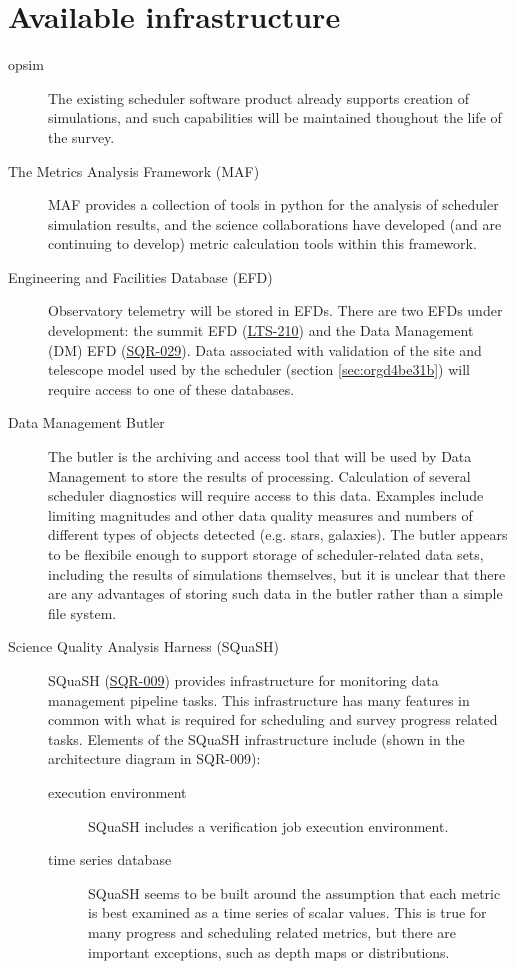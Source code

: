 \section{Available infrastructure}
\label{sec:org85291d5}
\begin{description}
\item[{opsim}] The existing scheduler software product already supports creation of simulations, and such capabilities will be maintained thoughout the life of the survey.
\item[{The Metrics Analysis Framework (MAF)}] MAF provides a collection of tools in python for the analysis of scheduler simulation results, and the science collaborations have developed (and are continuing to develop) metric calculation tools within this framework.
\item[{Engineering and Facilities Database (EFD)}] Observatory telemetry will be stored in EFDs. There are two EFDs under development: the summit EFD (\href{https://ls.st/LTS-210}{LTS-210}) and the Data Management (DM) EFD (\href{https://sqr-029.lsst.io/}{SQR-029}).  Data associated with validation of the site and telescope model used by the scheduler (section \ref{sec:orgd4be31b}) will require access to one of these databases.
\item[{Data Management Butler}] The butler is the archiving and access tool that will be used by Data Management to store the results of processing. Calculation of several scheduler diagnostics will require access to this data. Examples include limiting magnitudes and other data quality measures and numbers of different types of objects detected (e.g. stars, galaxies). The butler appears to be flexibile enough to support storage of scheduler-related data sets, including the results of simulations themselves, but it is unclear that there are any advantages of storing such data in the butler rather than a simple file system.
\item[{Science Quality Analysis Harness (SQuaSH)}] SQuaSH (\href{https://sqr-009.lsst.io/}{SQR-009}) provides infrastructure for monitoring data management pipeline tasks. This infrastructure has many features in common with what is required for scheduling and survey progress related tasks. Elements of the SQuaSH infrastructure include (shown in the architecture diagram in SQR-009):
\begin{description}
\item[{execution environment}] SQuaSH includes a verification job execution environment.
\item[{time series database}] SQuaSH seems to be built around the assumption that each metric is best examined as a time series of scalar values. This is true for many progress and scheduling related metrics, but there are important exceptions, such as depth maps or distributions.

\end{description}
\end{description}
